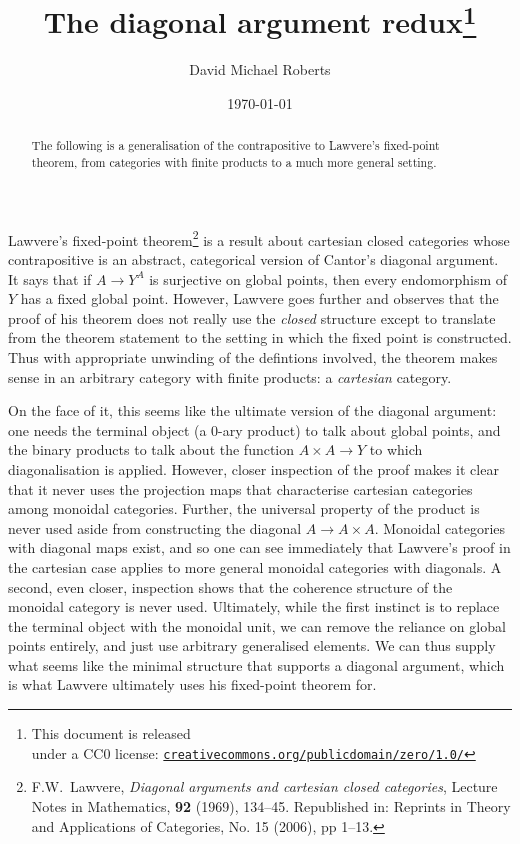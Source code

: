 \documentclass{tufte-handout}
\title{The diagonal argument redux\thanks{This document is released \\ under a CC0 license: \href{http://creativecommons.org/publicdomain/zero/1.0/}{\texttt{creativecommons.org/publicdomain/zero/1.0/}}}}
\author{David Michael Roberts}
\date{\today}
\theoremstyle{definition}
\begin{document}
\maketitle

\begin{abstract}
The following is a generalisation of the contrapositive to Lawvere's fixed-point theorem, from categories with finite products to a much more general setting.\end{abstract}

Lawvere's fixed-point theorem\footnote{F.W.~Lawvere, \emph{Diagonal arguments and cartesian closed categories}, Lecture Notes in Mathematics, \textbf{92} (1969), 134--45. Republished in:
Reprints in Theory and Applications of Categories, No. 15 (2006), pp 1--13.} is a result about cartesian closed categories whose contrapositive is an abstract, categorical version of Cantor's diagonal argument.
It says that if $A \to Y^A$ is surjective on global points, then every endomorphism of $Y$ has a fixed global point.
However, Lawvere goes further and observes that the proof of his theorem does not really use the \emph{closed} structure except to translate from the theorem statement to the setting in which the fixed point is constructed.
Thus with appropriate unwinding of the defintions involved, the theorem makes sense in an arbitrary category with finite products: a \emph{cartesian} category.

On the face of it, this seems like the ultimate version of the diagonal argument: one needs the terminal object (a $0$-ary product) to talk about global points, and the binary products to talk about the function $A\times A \to Y$ to which diagonalisation is applied.
However, closer inspection of the proof makes it clear that it never uses the projection maps that characterise cartesian categories among monoidal categories.
Further, the universal property of the product is never used aside from constructing the diagonal $A\to A\times A$. 
Monoidal categories with diagonal maps exist, and so one can see immediately that Lawvere's proof in the cartesian case applies to more general monoidal categories with diagonals.
A second, even closer, inspection shows that the coherence structure of the monoidal category is never used.
Ultimately, while the first instinct is to replace the terminal object with the monoidal unit, we can remove the reliance on global points entirely, and just use arbitrary generalised elements.
We can thus supply what seems like the minimal structure that supports a diagonal argument, which is what Lawvere ultimately uses his fixed-point theorem for.
\end{document}
